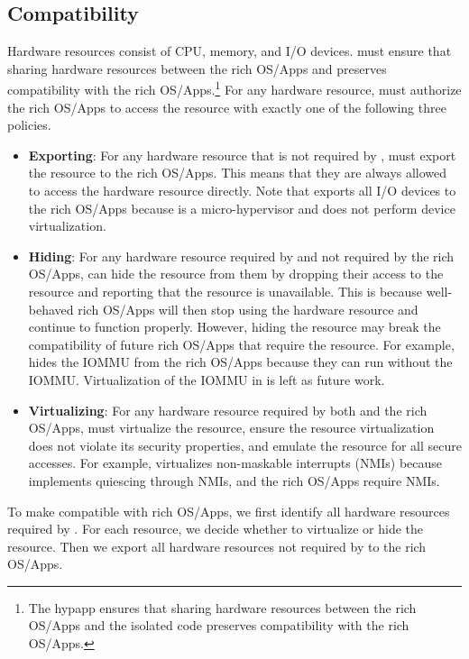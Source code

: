 \subsection{Compatibility}
\label{sec:design_compatibility}

Hardware resources consist of CPU, memory, and I/O devices.  must ensure that sharing hardware resources between the rich OS/Apps and  preserves compatibility with the rich OS/Apps.\footnote{The hypapp ensures that sharing hardware resources between the rich OS/Apps and the isolated code preserves compatibility with the rich OS/Apps.} For any hardware resource,  must authorize the rich OS/Apps to access the resource with exactly one of the following three policies.

\begin{itemize}

\item \textbf{Exporting}: For any hardware resource that is not required by ,  must export the resource to the rich OS/Apps. This means that they are always allowed to access the hardware resource directly. Note that  exports all I/O devices to the rich OS/Apps because  is a micro-hypervisor and does not perform device virtualization.

\item \textbf{Hiding}: For any hardware resource required by  and not required by the rich OS/Apps,  can hide the resource from them by dropping their access to the resource and reporting that the resource is unavailable. This is because well-behaved rich OS/Apps will then stop using the hardware resource and continue to function properly. However, hiding the resource may break the compatibility of future rich OS/Apps that require the resource.
For example,  hides the IOMMU from the rich OS/Apps because they can run without the IOMMU. Virtualization of the IOMMU in  is left as future work.

\item \textbf{Virtualizing}: For any hardware resource required by both  and the rich OS/Apps,  must virtualize the resource, ensure the resource virtualization does not violate its security properties, and emulate the resource for all secure accesses.
For example,  virtualizes non-maskable interrupts (NMIs) because  implements quiescing through NMIs, and the rich OS/Apps require NMIs.

\end{itemize}

To make  compatible with rich OS/Apps, we first identify all hardware resources required by . For each resource, we decide whether to virtualize or hide the resource. Then we export all hardware resources not required by  to the rich OS/Apps.

